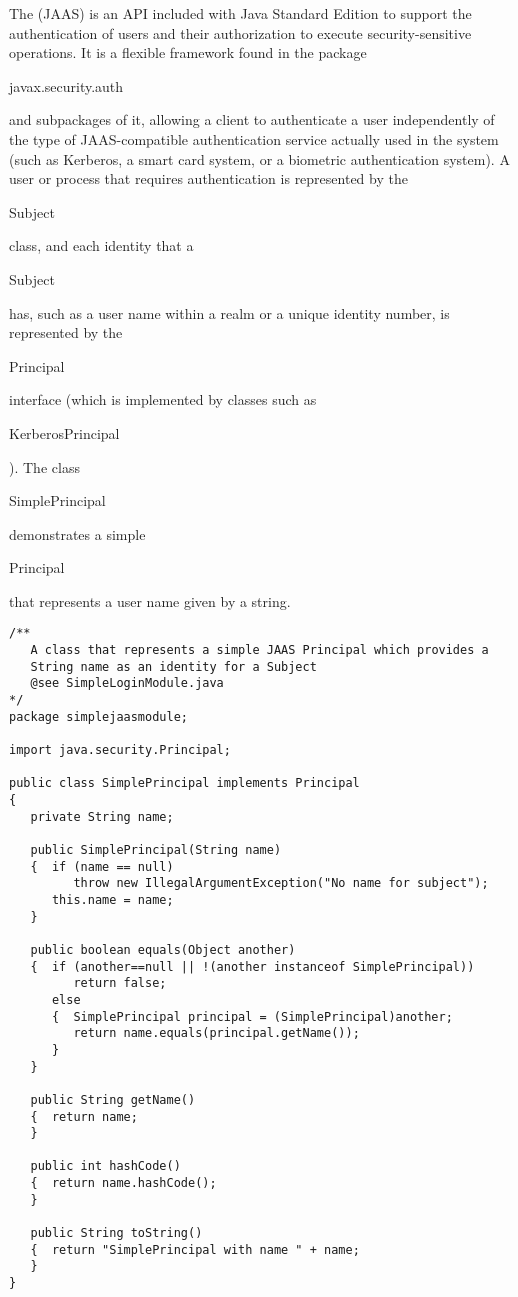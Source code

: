 The  (JAAS) is an API
included with Java Standard Edition to support the authentication of users and their
authorization to execute security-sensitive operations.
It is a flexible framework found in the package \begin{code}javax.security.auth\end{code}
and subpackages of it, allowing a client to authenticate a user independently of
the type of JAAS-compatible authentication service actually used in the system
(such as Kerberos, a smart card system, or a biometric authentication system).
A user or process that requires authentication is represented by the
\begin{code}Subject\end{code} class, and each identity that a
\begin{code}Subject\end{code} has,
such as a user name within a realm or a unique identity number,
is represented by the \begin{code}Principal\end{code} interface
(which is implemented by classes such as \begin{code}KerberosPrincipal\end{code}).
The class \begin{code}SimplePrincipal\end{code} demonstrates a simple
\begin{code}Principal\end{code} that represents a user name given by a string.
\begin{figure*}\begin{program}\begin{verbatim}
/**
   A class that represents a simple JAAS Principal which provides a
   String name as an identity for a Subject
   @see SimpleLoginModule.java
*/
package simplejaasmodule;

import java.security.Principal;

public class SimplePrincipal implements Principal
{
   private String name;

   public SimplePrincipal(String name)
   {  if (name == null)
         throw new IllegalArgumentException("No name for subject");
      this.name = name;
   }

   public boolean equals(Object another)
   {  if (another==null || !(another instanceof SimplePrincipal))
         return false;
      else
      {  SimplePrincipal principal = (SimplePrincipal)another;
         return name.equals(principal.getName());
      }
   }

   public String getName()
   {  return name;
   }

   public int hashCode()
   {  return name.hashCode();
   }

   public String toString()
   {  return "SimplePrincipal with name " + name;
   }
}
\end{verbatim}\end{program}\end{figure*}

